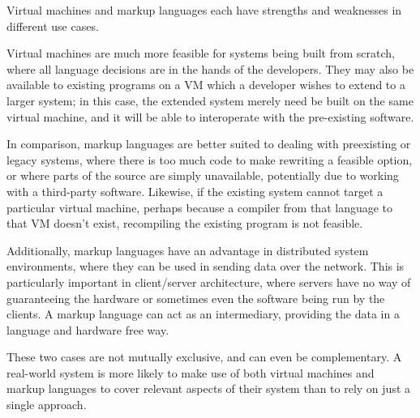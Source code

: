 \documentclass{sig-alternate}
\begin{document}
Virtual machines and markup languages each have strengths and weaknesses in different use cases.

Virtual machines are much more feasible for systems being built from scratch, where all language decisions are in the hands of the developers. They may also be available to existing programs on a VM which a developer wishes to extend to a larger system; in this case, the extended system merely need be built on the same virtual machine, and it will be able to interoperate with the pre-existing software.

In comparison, markup languages are better suited to dealing with preexisting or legacy systems, where there is too much code to make rewriting a feasible option, or where parts of the source are simply unavailable, potentially due to working with a third-party software. Likewise, if the existing system cannot target a particular virtual machine, perhaps because a compiler from that language to that VM doesn't exist, recompiling the existing program is not feasible.

Additionally, markup languages have an advantage in distributed system environments, where they can be used in sending data over the network. This is particularly important in client/server architecture, where servers have no way of guaranteeing the hardware or sometimes even the software being run by the clients. A markup language can act as an intermediary, providing the data in a language and hardware free way.


These two cases are not mutually exclusive, and can even be complementary. A real-world system is more likely to make use of both virtual machines and markup languages to cover relevant aspects of their system than to rely on just a single approach.










  
\end{document}
